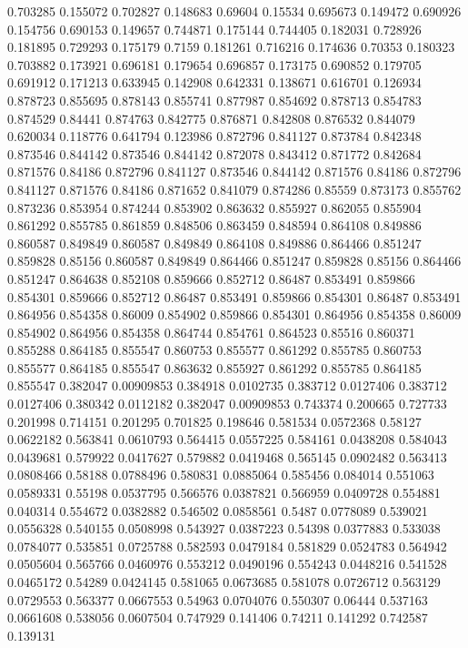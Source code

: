 0.703285 0.155072
0.702827 0.148683
0.69604 0.15534
0.695673 0.149472
0.690926 0.154756
0.690153 0.149657
0.744871 0.175144
0.744405 0.182031
0.728926 0.181895
0.729293 0.175179
0.7159 0.181261
0.716216 0.174636
0.70353 0.180323
0.703882 0.173921
0.696181 0.179654
0.696857 0.173175
0.690852 0.179705
0.691912 0.171213
0.633945 0.142908
0.642331 0.138671
0.616701 0.126934
0.878723 0.855695
0.878143 0.855741
0.877987 0.854692
0.878713 0.854783
0.874529 0.84441
0.874763 0.842775
0.876871 0.842808
0.876532 0.844079
0.620034 0.118776
0.641794 0.123986
0.872796 0.841127
0.873784 0.842348
0.873546 0.844142
0.873546 0.844142
0.872078 0.843412
0.871772 0.842684
0.871576 0.84186
0.872796 0.841127
0.873546 0.844142
0.871576 0.84186
0.872796 0.841127
0.871576 0.84186
0.871652 0.841079
0.874286 0.85559
0.873173 0.855762
0.873236 0.853954
0.874244 0.853902
0.863632 0.855927
0.862055 0.855904
0.861292 0.855785
0.861859 0.848506
0.863459 0.848594
0.864108 0.849886
0.860587 0.849849
0.860587 0.849849
0.864108 0.849886
0.864466 0.851247
0.859828 0.85156
0.860587 0.849849
0.864466 0.851247
0.859828 0.85156
0.864466 0.851247
0.864638 0.852108
0.859666 0.852712
0.86487 0.853491
0.859866 0.854301
0.859666 0.852712
0.86487 0.853491
0.859866 0.854301
0.86487 0.853491
0.864956 0.854358
0.86009 0.854902
0.859866 0.854301
0.864956 0.854358
0.86009 0.854902
0.864956 0.854358
0.864744 0.854761
0.864523 0.85516
0.860371 0.855288
0.864185 0.855547
0.860753 0.855577
0.861292 0.855785
0.860753 0.855577
0.864185 0.855547
0.863632 0.855927
0.861292 0.855785
0.864185 0.855547
0.382047 0.00909853
0.384918 0.0102735
0.383712 0.0127406
0.383712 0.0127406
0.380342 0.0112182
0.382047 0.00909853
0.743374 0.200665
0.727733 0.201998
0.714151 0.201295
0.701825 0.198646
0.581534 0.0572368
0.58127 0.0622182
0.563841 0.0610793
0.564415 0.0557225
0.584161 0.0438208
0.584043 0.0439681
0.579922 0.0417627
0.579882 0.0419468
0.565145 0.0902482
0.563413 0.0808466
0.58188 0.0788496
0.580831 0.0885064
0.585456 0.084014
0.551063 0.0589331
0.55198 0.0537795
0.566576 0.0387821
0.566959 0.0409728
0.554881 0.040314
0.554672 0.0382882
0.546502 0.0858561
0.5487 0.0778089
0.539021 0.0556328
0.540155 0.0508998
0.543927 0.0387223
0.54398 0.0377883
0.533038 0.0784077
0.535851 0.0725788
0.582593 0.0479184
0.581829 0.0524783
0.564942 0.0505604
0.565766 0.0460976
0.553212 0.0490196
0.554243 0.0448216
0.541528 0.0465172
0.54289 0.0424145
0.581065 0.0673685
0.581078 0.0726712
0.563129 0.0729553
0.563377 0.0667553
0.54963 0.0704076
0.550307 0.06444
0.537163 0.0661608
0.538056 0.0607504
0.747929 0.141406
0.74211 0.141292
0.742587 0.139131
